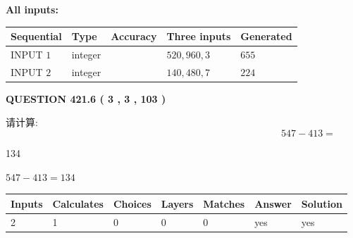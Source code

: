 \documentclass{ctexart}
\begin{document}
   
   
   
\noindent\vspace{0.1in}\hspace{-0.08in} {\textbf{\Large{All inputs: }}}
   
   
  
  
\noindent\begin{tabular}{|l|l|l|l|l|}
\hline
 Sequential & Type & Accuracy & Three inputs & Generated \\ 
\hline
 
 
  INPUT $  1 $ & integer &  & $
 520
 , 
 960
 , 
 3
 $ & $ 655 $ 
 \\  \hline  
 
 
  INPUT $  2 $ & integer &  & $
 140
 , 
 480
 , 
 7
 $ & $ 224 $ 
 \\  \hline  
 \end{tabular}
   
   
  
\vspace{0.2in}
  
{\textbf{\Large{QUESTION
421.6 
 ( 3 , 3 , 103 )
}}}
  
  
 
请计算:
\begin{equation}
547 -   %
413 = \nonumber
\end{equation}
 
 
 
\noindent{}
 
 

134
 
 
\noindent{}
 
 

 
 
 
\noindent{}
 
 

$ %
547 -  %
413=   %
134$
 
 
\noindent{}
 
 

 
   
   
   
   
\noindent\begin{tabular}{|l|l|l|l|l|l|l|}
 \hline
Inputs & Calculates & Choices & Layers & Matches & Answer & Solution \\ \hline
 2  & 
 1  & 
 0
  & 
 0  & 
 0  & 
  yes & 
  yes 
  \\ \hline
 \end{tabular}
   
\end{document}
